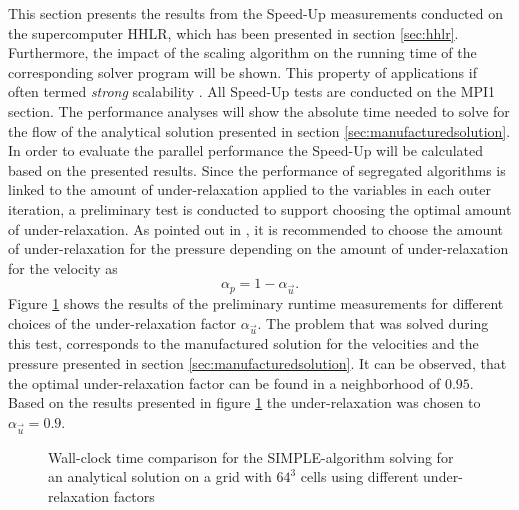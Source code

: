 This section presents the results from the Speed-Up measurements conducted on the supercomputer HHLR, which has been presented in section \ref{sec:hhlr}. Furthermore, the impact of the scaling algorithm on the running time of the corresponding solver program will be shown. This property of applications if often termed \emph{strong} scalability \cite{hager11}. All Speed-Up tests are conducted on the MPI1 section. The performance analyses will show the absolute time needed to solve for the flow of the analytical solution presented in section \ref{sec:manufacturedsolution}. In order to evaluate the parallel performance the Speed-Up will be calculated based on the presented results. Since the performance of segregated algorithms is linked to the amount of under-relaxation applied to the variables in each outer iteration, a preliminary test is conducted to support choosing the optimal amount of under-relaxation. As pointed out in \cite{ferziger02,schaefer99}, it is recommended to choose the amount of under-relaxation for the pressure depending on the amount of under-relaxation for the velocity as
\begin{displaymath}
  \alpha_p = 1 - \alpha_{\vec{u}}.
\end{displaymath}
Figure \ref{fig:underrelax} shows the results of the preliminary runtime measurements for different choices of the under-relaxation factor \( \alpha_{\vec{u}} \). The problem that was solved during this test, corresponds to the manufactured solution for the velocities and the pressure presented in section \ref{sec:manufacturedsolution}. It can be observed, that the optimal under-relaxation factor can be found in a neighborhood of \(0.95\). Based on the results presented in figure \ref{fig:underrelax} the under-relaxation was chosen to \( \alpha_{\vec{u}} =0.9 \). 

\begin{figure}[h!]
  \centering
  \caption{Wall-clock time comparison for the SIMPLE-algorithm solving for an analytical solution on a grid with $64^3$ cells using different under-relaxation factors}
  \label{fig:underrelax}
\end{figure}

